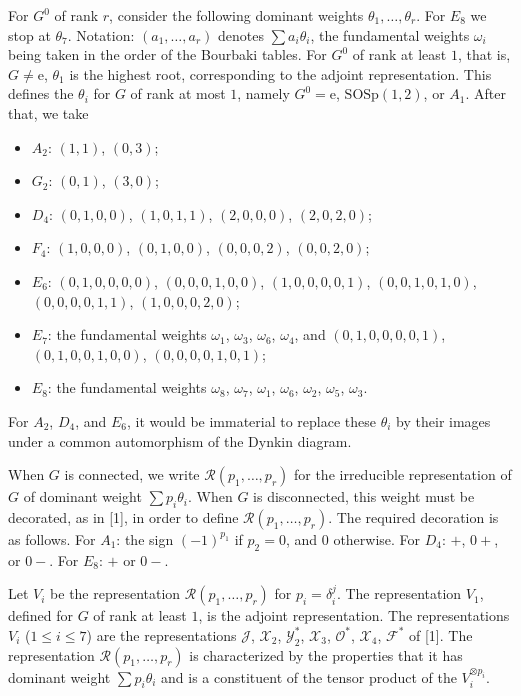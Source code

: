 \documentclass[11pt,a4paper]{article}
\theoremstyle{plain}
\theoremstyle{definition}
\begin{document}
For $G^0$ of rank $r$, consider the following dominant weights $\theta_1,\ldots,\theta_r$. For $E_8$ we stop at $\theta_7$. Notation: $(a_1,\ldots,a_r)$ denotes $\sum a_i\theta_i$, the fundamental weights $\omega_i$ being taken in the order of the Bourbaki tables. For $G^0$ of rank at least $1$, that is, $G\neq\mathrm{e}$, $\theta_1$ is the highest root, corresponding to the adjoint representation. This defines the $\theta_i$ for $G$ of rank at most $1$, namely $G^0=\mathrm{e}$, $\mathrm{SOSp}(1,2)$, or $A_1$. After that, we take
\begin{itemize}[leftmargin=2em]
\item[] $A_2$: $(1,1)$, $(0,3)$;
\item[] $G_2$: $(0,1)$, $(3,0)$;
\item[] $D_4$: $(0,1,0,0)$, $(1,0,1,1)$, $(2,0,0,0)$, $(2,0,2,0)$;
\item[] $F_4$: $(1,0,0,0)$, $(0,1,0,0)$, $(0,0,0,2)$, $(0,0,2,0)$;
\item[] $E_6$: $(0,1,0,0,0,0)$, $(0,0,0,1,0,0)$, $(1,0,0,0,0,1)$, $(0,0,1,0,1,0)$, $(0,0,0,0,1,1)$, $(1,0,0,0,2,0)$;
\item[] $E_7$: the fundamental weights $\omega_1$, $\omega_3$, $\omega_6$, $\omega_4$, and $(0,1,0,0,0,0,1)$, $(0,1,0,0,1,0,0)$, $(0,0,0,0,1,0,1)$;
\item[] $E_8$: the fundamental weights $\omega_8$, $\omega_7$, $\omega_1$, $\omega_6$, $\omega_2$, $\omega_5$, $\omega_3$.
\end{itemize}
For $A_2$, $D_4$, and $E_6$, it would be immaterial to replace these $\theta_i$ by their images under a common automorphism of the Dynkin diagram.

When $G$ is connected, we write $\mathcal R(p_1,\ldots,p_r)$ for the irreducible representation of $G$ of dominant weight $\sum p_i\theta_i$. When $G$ is disconnected, this weight must be decorated, as in [1], in order to define $\mathcal R(p_1,\ldots,p_r)$. The required decoration is as follows. For $A_1$: the sign $(-1)^{p_1}$ if $p_2=0$, and $0$ otherwise. For $D_4$: $+$, $0+$, or $0-$. For $E_8$: $+$ or $0-$.

Let $V_i$ be the representation $\mathcal R(p_1,\ldots,p_r)$ for $p_i=\delta_i^j$. The representation $V_1$, defined for $G$ of rank at least $1$, is the adjoint representation. The representations $V_i$ ($1\leq i\leq7$) are the representations $\mathcal J$, $\mathcal X_2$, $\mathcal Y_2^*$, $\mathcal X_3$, $\mathcal O^*$, $\mathcal X_4$, $\mathcal F^*$ of [1]. The representation $\mathcal R(p_1,\ldots,p_r)$ is characterized by the properties that it has dominant weight $\sum p_i\theta_i$ and is a constituent of the tensor product of the $V_i^{\otimes p_i}$.
\end{document}
